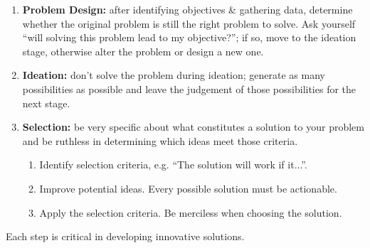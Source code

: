\documentclass[a4paper,11pt]{article}
\begin{document}
\begin{enumerate}
    \item   \textbf{Problem Design:} after identifying objectives \& gathering data, determine whether the 
            original problem is still the right problem to solve.
            Ask yourself ``will solving this problem lead to my objective?''; if so, move to the ideation stage,
            otherwise alter the problem or design a new one.

    \item   \textbf{Ideation:} don't solve the problem during ideation; generate as many possibilities as possible
            and leave the judgement of those possibilities for the next stage.

    \item   \textbf{Selection:} be very specific about what constitutes a solution to your problem and be 
            ruthless in determining which ideas meet those criteria.
            \begin{enumerate}[label=\roman*.]
                \item   Identify selection criteria, e.g. ``The solution will work if it...''.
                \item   Improve potential ideas. Every possible solution must be actionable.
                \item   Apply the selection criteria. Be merciless when choosing the solution.
            \end{enumerate}
\end{enumerate}

Each step is critical in developing innovative solutions.
\end{document}
